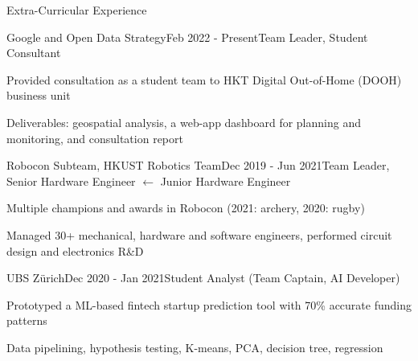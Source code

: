 \documentclass{resume}
\begin{document}
\begin{rSection}{Extra-Curricular Experience}
    
    \begin{rSubsection}{Google and Open Data Strategy}{Feb 2022 - Present}{Team Leader, Student Consultant}{}
        \item Provided consultation as a student team to HKT Digital Out-of-Home (DOOH) business unit
        \item Deliverables: geospatial analysis, a web-app dashboard for planning and monitoring, and consultation report
    \end{rSubsection}

    
    \begin{rSubsection}{Robocon Subteam, HKUST Robotics Team}{Dec 2019 - Jun 2021}{Team Leader, Senior Hardware Engineer $\leftarrow$ Junior Hardware Engineer}{}
        \item Multiple champions and awards in Robocon (2021: archery, 2020: rugby)
        \item Managed 30+ mechanical, hardware and software engineers, performed circuit design and electronics R\&D
    \end{rSubsection}

    \begin{rSubsection}{UBS Zürich}{Dec 2020 - Jan 2021}{Student Analyst (Team Captain, AI Developer)}{}
        \item Prototyped a ML-based fintech startup prediction tool with 70\% accurate funding patterns
        \item Data pipelining, hypothesis testing, K-means, PCA, decision tree, regression
    \end{rSubsection}

\end{rSection}
\end{document}
